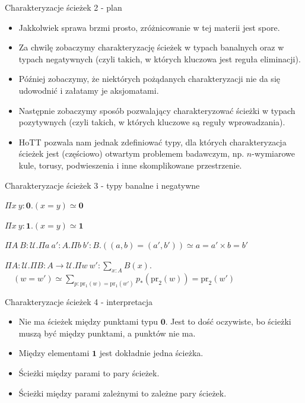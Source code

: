 \documentclass{beamer}
\newcommand{\U}{\mathcal{U}}
\newcommand{\prl}{\text{pr}_1}
\newcommand{\prr}{\text{pr}_2}
\begin{document}
\begin{frame}{Charakteryzacje ścieżek 2 - plan}
\begin{itemize}
	\item Jakkolwiek sprawa brzmi prosto, zróżnicowanie w tej materii jest spore.
	\item Za chwilę zobaczymy charakteryzację ścieżek w typach banalnych oraz w typach negatywnych (czyli takich, w których kluczowa jest reguła eliminacji).
	\item Później zobaczymy, że niektórych pożądanych charakteryzacji nie da się udowodnić i załatamy je aksjomatami.
	\item Następnie zobaczymy sposób pozwalający charakteryzować ścieżki w typach pozytywnych (czyli takich, w których kluczowe są reguły wprowadzania).
	\item HoTT pozwala nam jednak zdefiniować typy, dla których charakteryzacja ścieżek jest (częściowo) otwartym problemem badawczym, np. $n$-wymiarowe kule, torusy, podwieszenia i inne skomplikowane przestrzenie.
\end{itemize}
\end{frame}

\begin{frame}{Charakteryzacje ścieżek 3 - typy banalne i negatywne}

\begin{theorem}
$\Pi x\ y : \mathbf{0}. (x = y) \simeq \mathbf{0}$
\end{theorem}

\begin{theorem}
$\Pi x\ y : \mathbf{1}. (x = y) \simeq \mathbf{1}$
\end{theorem}

\begin{theorem}
$\Pi A\ B : \U. \Pi a\ a' : A. \Pi b\ b': B. ((a, b) = (a', b')) \simeq a = a' \times b = b'$
\end{theorem}

\begin{theorem}
$\Pi A : \U. \Pi B : A \to \U. \Pi w\ w' : \sum_{x : A} B(x).$ \\
	$\displaystyle \quad (w = w') \simeq \sum_{p : \prl(w) = \prl(w')} p_*(\prr(w)) = \prr(w')$
\end{theorem}

\end{frame}
\begin{frame}{Charakteryzacje ścieżek 4 - interpretacja}
\begin{itemize}
	\item Nie ma ścieżek między punktami typu $\mathbf{0}$. Jest to dość oczywiste, bo ścieżki muszą być między punktami, a punktów nie ma.
	\item Między elementami $\mathbf{1}$ jest dokładnie jedna ścieżka.
	\item Ścieżki między parami to pary ścieżek.
	\item Ścieżki między parami zależnymi to zależne pary ścieżek.
\end{itemize}
\end{frame}
\end{document}

